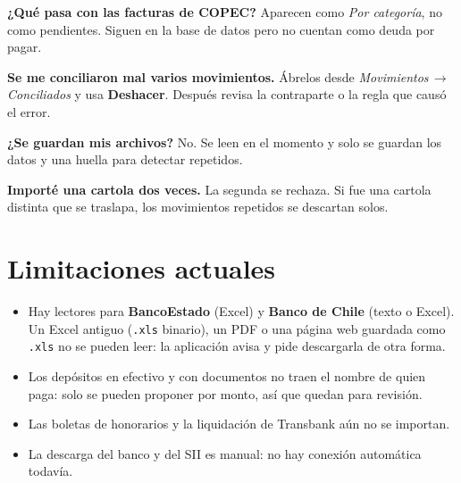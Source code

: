 \documentclass[11pt,a4paper]{article}
\newcommand{\ui}[1]{\textsf{\textbf{#1}}}                       %
\newcommand{\ruta}[1]{\textsf{\textit{#1}}}                      %
\newcommand{\flecha}{\,$\rightarrow$\,}
\newcommand{\cod}[1]{\texttt{#1}}
\begin{document}
\textbf{¿Qué pasa con las facturas de COPEC?} Aparecen como \emph{Por categoría}, no como pendientes. Siguen en la base de datos pero no cuentan como deuda por pagar.

\textbf{Se me conciliaron mal varios movimientos.} Ábrelos desde \ruta{Movimientos\flecha Conciliados} y usa \ui{Deshacer}. Después revisa la contraparte o la regla que causó el error.

\textbf{¿Se guardan mis archivos?} No. Se leen en el momento y solo se guardan los datos y una huella para detectar repetidos.

\textbf{Importé una cartola dos veces.} La segunda se rechaza. Si fue una cartola distinta que se traslapa, los movimientos repetidos se descartan solos.

\section{Limitaciones actuales}

\begin{itemize}
\item Hay lectores para \textbf{BancoEstado} (Excel) y \textbf{Banco de Chile} (texto o Excel). Un Excel antiguo (\cod{.xls} binario), un PDF o una página web guardada como \cod{.xls} no se pueden leer: la aplicación avisa y pide descargarla de otra forma.
\item Los depósitos en efectivo y con documentos no traen el nombre de quien paga: solo se pueden proponer por monto, así que quedan para revisión.
\item Las boletas de honorarios y la liquidación de Transbank aún no se importan.
\item La descarga del banco y del SII es manual: no hay conexión automática todavía.
\end{itemize}
\end{document}
